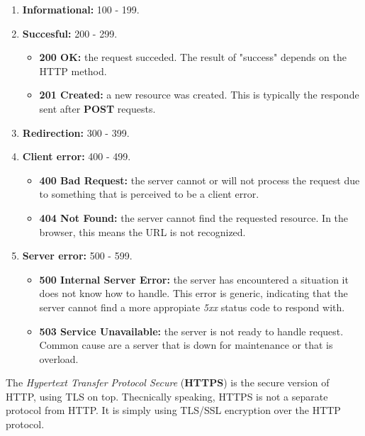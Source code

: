 \begin{enumerate}
  \item \textbf{Informational:} 100 - 199.
  \item \textbf{Succesful:} 200 - 299.
    \begin{itemize}
      \item \textbf{200 OK:} the request succeded. The result of "success" depends on the HTTP method.
      \item \textbf{201 Created:} a new resource was created. This is typically the responde sent after \textbf{POST} requests.
    \end{itemize}
  \item \textbf{Redirection:} 300 - 399.
  \item \textbf{Client error:} 400 - 499.
    \begin{itemize}
      \item \textbf{400 Bad Request:} the server cannot or will not process the request due to something that is perceived to be a client error.
      \item \textbf{404 Not Found:} the server cannot find the requested resource. In the browser, this means the URL is not recognized.
    \end{itemize}
  \item \textbf{Server error:} 500 - 599.
    \begin{itemize}
      \item \textbf{500 Internal Server Error:} the server has encountered a situation it does not know how to handle. This error is generic, indicating that the server cannot find a more appropiate \textit{5xx} status code to respond with.
      \item \textbf{503 Service Unavailable:} the server is not ready to handle request. Common cause are a server that is down for maintenance or that is overload.
    \end{itemize}
\end{enumerate}

The \textit{Hypertext Transfer Protocol Secure} (\textbf{HTTPS}) is the secure version of HTTP, using TLS on top. Thecnically speaking, HTTPS is not a separate protocol from HTTP. It is simply using TLS/SSL encryption over the HTTP protocol.
